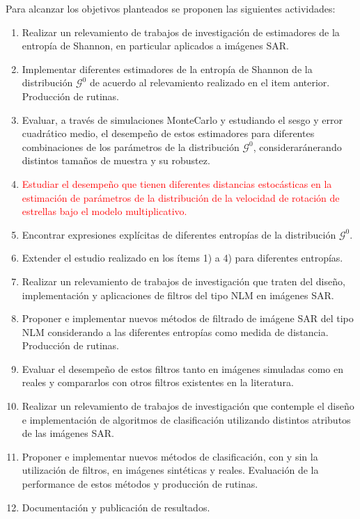 \documentclass[11pt]{article}
\begin{document}
Para alcanzar los objetivos planteados se proponen las siguientes actividades:
\begin{enumerate}
	\item Realizar un relevamiento de trabajos de investigación de estimadores de la entropía de Shannon, en particular aplicados a imágenes SAR.
	\item Implementar diferentes estimadores de la entropía de Shannon de la distribución $\mathcal{G}^{0}$ de acuerdo al relevamiento realizado en el item anterior. Producción de rutinas.
	\item Evaluar, a través de simulaciones MonteCarlo y estudiando el sesgo y error cuadrático medio, el desempeño de estos estimadores para diferentes combinaciones de los parámetros de la distribución $\mathcal{G}^{0}$, consideraránerando distintos tamaños de muestra y su robustez.
	\item \textcolor{red}{Estudiar el desempeño que tienen diferentes distancias estocásticas en la estimación de parámetros de la distribución de la velocidad de rotación de estrellas bajo el modelo multiplicativo.}
	\item Encontrar expresiones explícitas de diferentes entropías de la distribución $\mathcal{G}^{0}$.
	\item Extender el estudio realizado en los ítems 1) a 4) para diferentes entropías.
	\item Realizar un relevamiento de trabajos de investigación que traten del diseño, implementación y aplicaciones de filtros del tipo NLM en imágenes SAR.
	\item Proponer e implementar nuevos métodos de filtrado de imágene SAR del tipo NLM considerando a las diferentes entropías  como medida de distancia. Producción de rutinas.
	\item Evaluar el desempeño de estos filtros tanto en imágenes simuladas como en reales  y compararlos con otros filtros existentes en la literatura.
	\item Realizar un relevamiento de trabajos de investigación que contemple el diseño e implementación de algoritmos de clasificación utilizando distintos atributos de las imágenes SAR.
	\item Proponer e implementar nuevos métodos de clasificación, con y sin la utilización de filtros, en imágenes sintéticas y reales. Evaluación de la performance de estos métodos y producción de rutinas.
	\item Documentación y publicación de resultados.
	
\end{enumerate}
\end{document}
